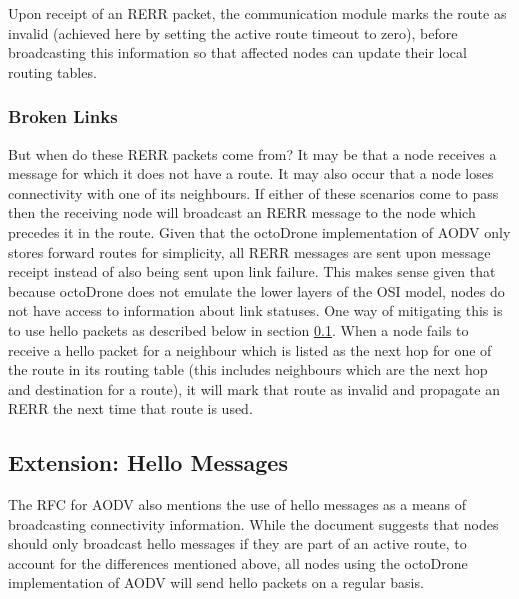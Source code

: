 Upon receipt of an RERR packet, the communication module marks the route as invalid (achieved here by setting the active route timeout to zero), before broadcasting this information so that affected nodes can update their local routing tables.

\subsubsection{Broken Links}
But when do these RERR packets come from? It may be that a node receives a message for which it does not have a route. It may also occur that a node loses connectivity with one of its neighbours. If either of these scenarios come to pass then the receiving node will broadcast an RERR message to the node which precedes it in the route. Given that the octoDrone implementation of AODV only stores forward routes for simplicity, all RERR messages are sent upon message receipt instead of also being sent upon link failure. This makes sense given that because octoDrone does not emulate the lower layers of the OSI model, nodes do not have access to information about link statuses. One way of mitigating this is to use hello packets as described below in section \ref{hello}. When a node fails to receive a hello packet for a neighbour which is listed as the next hop for one of the route in its routing table (this includes neighbours which are the next hop and destination for a route), it will mark that route as invalid and propagate an RERR the next time that route is used.

\subsection{Extension: Hello Messages}
\label{hello}
The RFC for AODV also mentions the use of hello messages as a means of broadcasting connectivity information. While the document suggests that nodes should only broadcast hello messages if they are part of an active route, to account for the differences mentioned above, all nodes using the octoDrone implementation of AODV will send hello packets on a regular basis.
